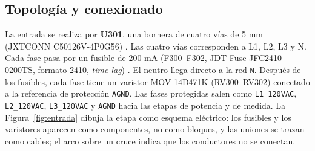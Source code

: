 \documentclass[11pt,a4paper]{article}
\begin{document}
\subsection{Topología y conexionado}

La entrada se realiza por \textbf{U301}, una bornera de cuatro vías de 5 mm
(JXTCONN C50126V-4P0G56) \cite{jxtconn}. Las cuatro vías corresponden a L1, L2,
L3 y N. Cada fase pasa por un fusible de 200 mA (F300--F302, JDT Fuse
JFC2410-0200TS, formato 2410, \emph{time-lag}) \cite{jfcfuse}. El neutro llega
directo a la red \texttt{N}. Después de los fusibles, cada fase tiene un varistor
MOV-14D471K (RV300--RV302) conectado a la referencia de protección \texttt{AGND}.
Las fases protegidas salen como \texttt{L1\_120VAC}, \texttt{L2\_120VAC},
\texttt{L3\_120VAC} y \texttt{AGND} hacia las etapas de potencia y de medida. La
Figura~\ref{fig:entrada} dibuja la etapa como esquema eléctrico: los fusibles y
los varistores aparecen como componentes, no como bloques, y las uniones se
trazan como cables; el arco sobre un cruce indica que los conductores no se
conectan.
\end{document}
